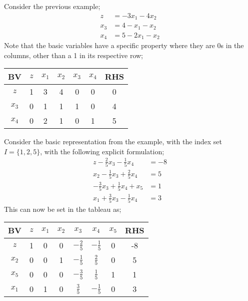 \documentclass[a4paper, 12pt]{article}
\begin{document}
                Consider the previous example;
                \begin{align*}
                    z & = -3x_1 - 4x_2 \\
                    x_3 & = 4 - x_1 - x_2 \\
                    x_4 & = 5 - 2x_1 - x_2
                \end{align*}
                Note that the basic variables have a specific property where they are 0s in the columns, other than a 1 in its respective row;
                \begin{center}
                    \begin{tabular}{c|ccccc|c}
                        BV & $z$ & $x_1$ & $x_2$ & $x_3$ & $x_4$ & RHS \\
                        \hline
                        $z$ & 1 & 3 & 4 & 0 & 0 & 0 \\
                        $x_3$ & 0 & 1 & 1 & 1 & 0 & 4 \\
                        $x_4$ & 0 & 2 & 1 & 0 & 1 & 5
                    \end{tabular}
                \end{center}
                Consider the basic representation from the example, with the index set $I = \{1, 2, 5\}$, with the following explicit formulation;
                \begin{align*}
                    z - \frac{2}{5}x_3 - \frac{1}{5}x_4 & = -8 \\
                    x_2 - \frac{1}{5}x_3 + \frac{2}{5}x_4 & = 5 \\
                    -\frac{3}{5}x_3 + \frac{1}{5}x_4 + x_5 & = 1 \\
                    x_1 + \frac{3}{5}x_3 - \frac{1}{5}x_4 & = 3
                \end{align*}
                This can now be set in the tableau as;
                \begin{center}
                    \begin{tabular}{c|cccccc|c}
                        BV & $z$ & $x_1$ & $x_2$ & $x_3$ & $x_4$ & $x_5$ & RHS \\
                        \hline
                        $z$ & 1 & 0 & 0 & $-\frac{2}{5}$ & $-\frac{1}{5}$ & 0 & -8 \\
                        $x_2$ & 0 & 0 & 1 & $-\frac{1}{5}$ & $\frac{2}{5}$ & 0 & 5 \\
                        $x_5$ & 0 & 0 & 0 & $-\frac{3}{5}$ & $\frac{1}{5}$ & 1 & 1 \\
                        $x_1$ & 0 & 1 & 0 & $\frac{3}{5}$ & $-\frac{1}{5}$ & 0 & 3
                    \end{tabular}
                \end{center}
\end{document}
